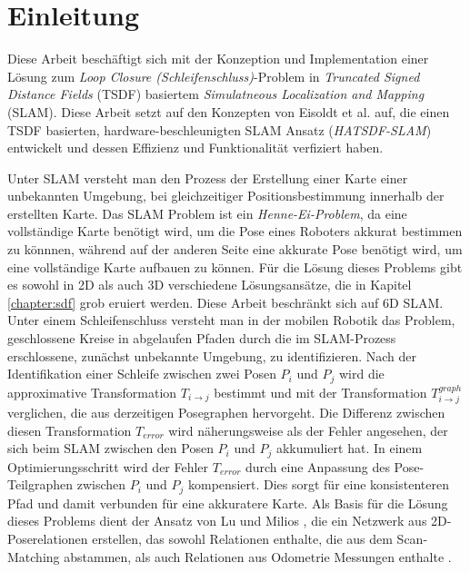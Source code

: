 \chapter{Einleitung}

Diese Arbeit beschäftigt sich mit der Konzeption und Implementation einer Lösung zum \textit{Loop Closure  (Schleifenschluss)}-Problem in \textit{Truncated Signed Distance Fields} (TSDF) basiertem \textit{Simulatneous Localization and Mapping} (SLAM).
Diese Arbeit setzt auf den Konzepten von Eisoldt et al. \cite{HATSDF} auf, die einen TSDF basierten, hardware-beschleunigten SLAM Ansatz (\textit{HATSDF-SLAM}) entwickelt und dessen Effizienz und Funktionalität verfiziert haben.

Unter SLAM versteht man den Prozess der Erstellung einer Karte einer unbekannten Umgebung, bei gleichzeitiger Positionsbestimmung innerhalb der erstellten Karte.
Das SLAM Problem ist ein \textit{Henne-Ei-Problem}, da eine vollständige Karte benötigt wird, um die Pose eines Roboters akkurat bestimmen zu könnnen, während auf der anderen Seite eine akkurate Pose benötigt wird, um eine vollständige Karte aufbauen zu können.
Für die Lösung dieses Problems gibt es sowohl in 2D als auch 3D verschiedene Lösungsansätze, die in Kapitel \ref{chapter:sdf} grob eruiert werden.
Diese Arbeit beschränkt sich auf 6D SLAM.
Unter einem Schleifenschluss versteht man in der mobilen Robotik das Problem, geschlossene Kreise in abgelaufen Pfaden durch die im SLAM-Prozess erschlossene, zunächst unbekannte Umgebung, zu identifizieren. Nach der Identifikation einer Schleife zwischen zwei Posen $P_i$ und $P_j$ wird die approximative Transformation $T_{i \rightarrow j}$ bestimmt und mit der Transformation $T_{i \rightarrow j}^{graph}$  verglichen, die aus derzeitigen Posegraphen hervorgeht. Die Differenz zwischen diesen Transformation $T_{error}$ wird näherungsweise als der Fehler angesehen, der sich beim SLAM zwischen den Posen $P_i$ und $P_j$ akkumuliert hat. In einem Optimierungsschritt wird der Fehler $T_{error}$ durch eine Anpassung des Pose-Teilgraphen zwischen $P_i$ und $P_j$ kompensiert. Dies sorgt für eine konsistenteren Pfad und damit verbunden für eine akkuratere Karte. 
Als Basis für die Lösung dieses Problems dient der Ansatz von Lu und Milios \cite{lu1997globally}, die ein Netzwerk aus 2D-Poserelationen erstellen, das sowohl Relationen enthalte, die aus dem Scan-Matching abstammen, als auch Relationen aus Odometrie Messungen enthalte \cite{lu1997globally}. 
